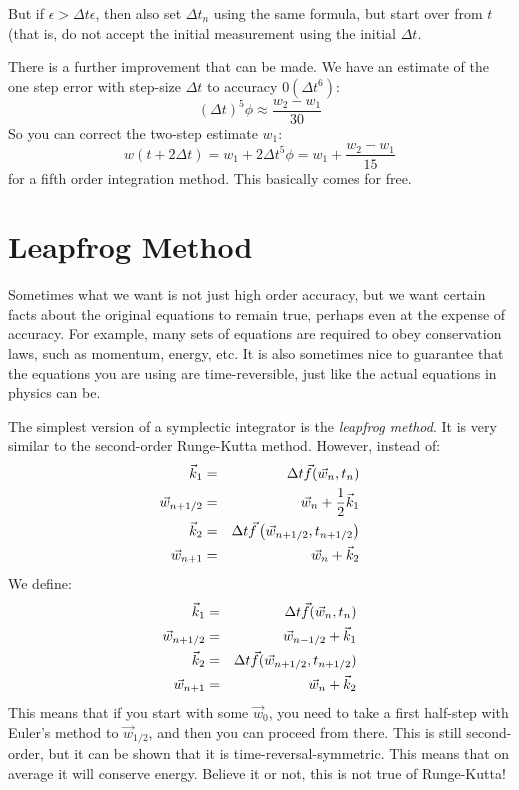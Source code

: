 But if $\epsilon > \Delta t \epsilon$, then also set $\Delta t_n$
using the same formula, but start over from $t$ (that is, do not
accept the initial measurement using the initial $\Delta t$.

There is a further improvement that can be made. We have an estimate
of the one step error with step-size $\Delta t$ to accuracy
$\mathcal{0}(\Delta t^6)$:
\begin{equation}
  (\Delta t)^5 \phi \approx \frac{w_2 - w_1}{30}
\end{equation}
So you can correct the two-step estimate $w_1$:
\begin{equation}
w(t+ 2\Delta t) = w_1 + 2 \Delta t^5 \phi = w_1 + 
  \frac{w_2 - w_1}{15}
\end{equation}
for a fifth order integration method. This basically comes for free. 

\section{Leapfrog Method}

Sometimes what we want is not just high order accuracy, but we want
certain facts about the original equations to remain true, perhaps
even at the expense of accuracy. For example, many sets of equations
are required to obey conservation laws, such as momentum, energy,
etc. It is also sometimes nice to guarantee that the equations you are
using are time-reversible, just like the actual equations in physics
can be.

The simplest version of a symplectic integrator is the {\it leapfrog
  method}. It is very similar to the second-order Runge-Kutta method. 
However, instead of:
\begin{eqnarray}
\vec{k}_1 &=& \Delta t \vec{f}(\vec{w}_n, t_n) \cr
\vec{w}_{n+1/2} &=& \vec{w}_n + \frac{1}{2}\vec{k}_1 \cr
\vec{k}_2 &=& \Delta t \vec{f}\left(\vec{w}_{n+1/2}, t_{n+1/2}\right) \cr
\vec{w}_{n+1} &=& \vec{w}_n + \vec{k}_2
\end{eqnarray}
We define:
\begin{eqnarray}
\vec{k}_1 &=& \Delta t \vec{f}(\vec{w}_n, t_n) \cr
\vec{w}_{n+1/2} &=& \vec{w}_{n-1/2} + \vec{k}_1 \cr
\vec{k}_2 &=& \Delta t \vec{f}(\vec{w}_{n+1/2}, t_{n+1/2}) \cr
\vec{w}_{n+1} &=& \vec{w}_{n} + \vec{k}_2
\end{eqnarray}
This means that if you start with some $\vec{w}_0$, you need to take a
first half-step with Euler's method to $\vec{w}_{1/2}$, and then you
can proceed from there. This is still second-order, but it can be
shown that it is time-reversal-symmetric. This means that on average
it will conserve energy. Believe it or not, this is not true of
Runge-Kutta!

